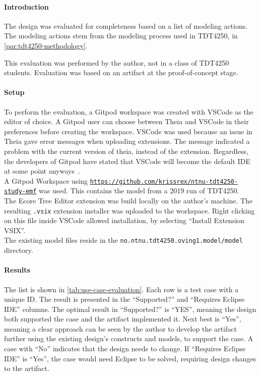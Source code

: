 
\paragraph{Introduction}
The design was evaluated for completeness based on a list of modeling actions.
The modeling actions stem from the modeling process used in \gls{TDT4250}, in \cref{par:tdt4250-methodology}.

This evaluation was performed by the author, not in a class of \gls{TDT4250} students.
Evaluation was based on an artifact at the proof-of-concept stage.\\

\paragraph{Setup}
To perform the evaluation, a \gls{Gitpod} workspace was created with \gls{VSCode} as the editor of choice.
A \gls{Gitpod} user can choose between \gls{Theia} and \gls{VSCode} in their preferences before creating the workspace.
\Gls{VSCode} was used because an issue in Theia gave error messages when uploading extensions.
The message indicated a problem with the current version of theia, instead of the extension.
Regardless, the developers of \gls{Gitpod} have stated that \gls{VSCode} will become the default \acrshort{IDE} at some point anyways~\cite{georgetsiolisMenuEntryGitpod2019,svenefftingeProductRoadmapQ1}.\\

A \gls{Gitpod} Workspace using \href{https://github.com/krissrex/ntnu-tdt4250-study-emf}{\nolinkurl{https://github.com/krissrex/ntnu-tdt4250-study-emf}} was used.
This contains the model from a 2019 run of \gls{TDT4250}.\\

The Ecore Tree Editor extension was build locally on the author's machine.
The resulting \texttt{.vsix} extension installer was uploaded to the workspace.
Right clicking on this file inside \gls{VSCode} allowed installation, by selecting ``Install Extension VSIX''.\\

The existing model files reside in the \lstinline{no.ntnu.tdt4250.oving1.model/model} directory.


\paragraph{Results}
The list is shown in \cref{tab:use-case-evaluation}.
Each row is a test case with a unique ID.
The result is presented in the ``Supported?'' and ``Requires Eclipse IDE'' columns.
The optimal result in ``Supported?'' is ``YES'', meaning the design both supported the case and the artifact implemented it.
Next best is ``Yes'', meaning a clear approach can be seen by the author to develop the artifact further using the existing design's constructs and models, to support the case.
A case with ``No'' indicates that the design needs to change.
If ``Requires Eclipse IDE'' is ``Yes'', the case would need \gls{Eclipse} to be solved, requiring design changes to the artifact.

